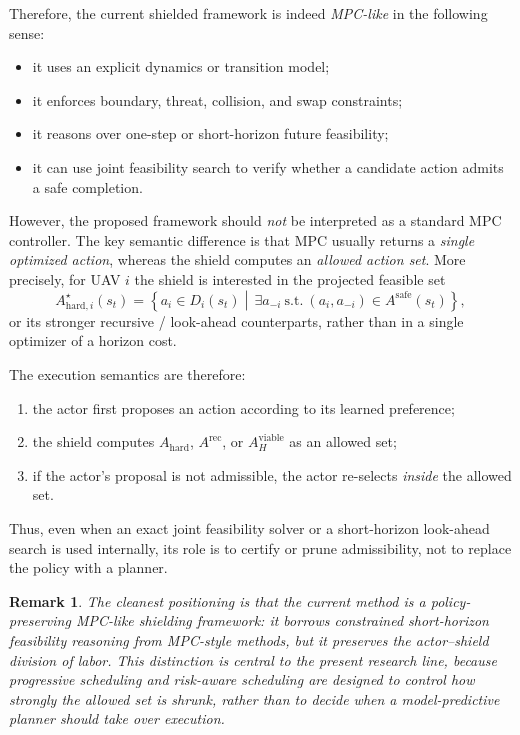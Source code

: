 \documentclass[11pt]{article}
\newtheorem{remark}{Remark}
\begin{document}
Therefore, the current shielded framework is indeed \emph{MPC-like} in the following sense:
\begin{itemize}[leftmargin=1.5em]
    \item it uses an explicit dynamics or transition model;
    \item it enforces boundary, threat, collision, and swap constraints;
    \item it reasons over one-step or short-horizon future feasibility;
    \item it can use joint feasibility search to verify whether a candidate action admits a safe completion.
\end{itemize}

However, the proposed framework should \emph{not} be interpreted as a standard MPC controller. The key semantic difference is that MPC usually returns a \emph{single optimized action}, whereas the shield computes an \emph{allowed action set}. More precisely, for UAV $i$ the shield is interested in the projected feasible set
\begin{equation}
A^{\star}_{\mathrm{hard},i}(s_t)
=
\left\{
a_i \in D_i(s_t)
\middle|\,
\exists a_{-i}\ \text{s.t.}\ (a_i,a_{-i}) \in A^{\mathrm{safe}}(s_t)
\right\},
\end{equation}
or its stronger recursive / look-ahead counterparts, rather than in a single optimizer of a horizon cost.

The execution semantics are therefore:
\begin{enumerate}[label=(\arabic*),leftmargin=1.8em]
    \item the actor first proposes an action according to its learned preference;
    \item the shield computes $A_{\mathrm{hard}}$, $A^{\mathrm{rec}}$, or $A_H^{\mathrm{viable}}$ as an allowed set;
    \item if the actor's proposal is not admissible, the actor re-selects \emph{inside} the allowed set.
\end{enumerate}
Thus, even when an exact joint feasibility solver or a short-horizon look-ahead search is used internally, its role is to certify or prune admissibility, not to replace the policy with a planner.

\begin{remark}
The cleanest positioning is that the current method is a \emph{policy-preserving MPC-like shielding framework}: it borrows constrained short-horizon feasibility reasoning from MPC-style methods, but it preserves the actor--shield division of labor. This distinction is central to the present research line, because progressive scheduling and risk-aware scheduling are designed to control \emph{how strongly the allowed set is shrunk}, rather than to decide when a model-predictive planner should take over execution.
\end{remark}
\end{document}
